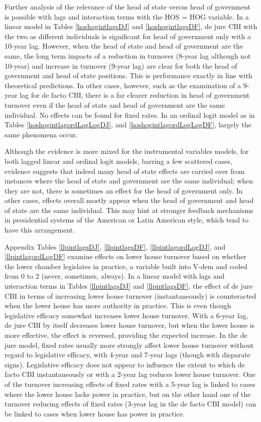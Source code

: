 \documentclass{article}
\begin{document}
    Further analysis of the relevance of the head of state versus head of government is possible with lags and interaction terms with the HOS = HOG variable. In a linear model in Tables \ref{hoshogintlagsDJ} and \ref{hoshogintlagsDF}, de jure CBI with the two as different individuals is significant for head of government only with a 10-year lag. However, when the head of state and head of government are the same, the long term impacts of a reduction in turnover (8-year lag although not 10-year) and increase in turnover (9-year lag) are clear for both the head of government and head of state positions. This is performance exactly in line with theoretical predictions. In other cases, however, such as the examination of a 9-year lag for de facto CBI, there is a far clearer reduction in head of government turnover even if the head of state and head of government are the same individual. No effects can be found for fixed rates. In an ordinal logit model as in Tables \ref{hoshogintlagordLogLogDJ}, and \ref{hoshogintlagordLogLogDF}, largely the same phenomena occur. 

    Although the evidence is more mixed for the instrumental variables models, for both lagged linear and ordinal logit models, barring a few scattered cases, evidence suggests that indeed many head of state effects are carried over from instances where the head of state and government are the same individual; when they are not, there is sometimes an effect for the head of government only. In other cases, effects overall mostly appear when the head of government and head of state are the same individual. This may hint at stronger feedback mechanisms in presidential systems of the American or Latin American style, which tend to have this arrangement.

    Appendix Tables \ref{llpintlagsDJ}, \ref{llpintlagsDF}, \ref{llpintlagordLogDJ}, and \ref{llpintlagordLogDF} examine effects on lower house turnover based on whether the lower chamber legislates in practice, a variable built into V-dem and coded from 0 to 2 (never, sometimes, always). In a linear model with lags and interaction terms in Tables \ref{llpintlagsDJ} and \ref{llpintlagsDF}, the effect of de jure CBI in terms of increasing lower house turnover (instantaneously) is counteracted when the lower house has more authority in practice. This is even though legislative efficacy somewhat increases lower house turnover. With a 6-year lag, de jure CBI by itself decreases lower house turnover, but when the lower house is more effective, the effect is reversed, providing the expected increase. In the de jure model, fixed rates usually more strongly affect lower house turnover without regard to legislative efficacy, with 4-year and 7-year lags (though with disparate signs). Legislative efficacy does not appear to influence the extent to which de facto CBI instantaneously or with a 2-year lag reduces lower house turnover. One of the turnover increasing effects of fixed rates with a 5-year lag is linked to cases where the lower house lacks power in practice, but on the other hand one of the turnover reducing effects of fixed rates (3-year lag in the de facto CBI model) can be linked to cases when lower house has power in practice.
\end{document}

